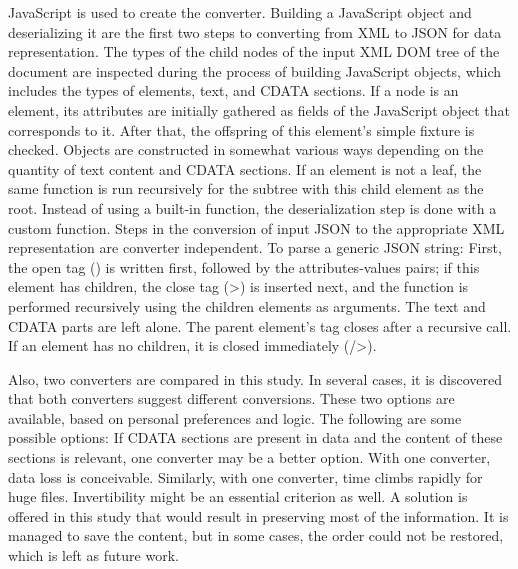 JavaScript is used to create the converter. Building a JavaScript object and
deserializing it are the first two steps to converting from XML to JSON for data
representation. The types of the child nodes of the input XML DOM tree of the
document are inspected during the process of building JavaScript objects, which
includes the types of elements, text, and CDATA sections. If a node is an
element, its attributes are initially gathered as fields of the JavaScript
object that corresponds to it. After that, the offspring of this element's
simple fixture is checked. Objects are constructed in somewhat various ways
depending on the quantity of text content and CDATA sections. If an element is
not a leaf, the same function is run recursively for the subtree with this child
element as the root. Instead of using a built-in function, the deserialization
step is done with a custom function. Steps in the conversion of input JSON to
the appropriate XML representation are converter independent. To parse a generic
JSON string: First, the open tag () is written first, followed by the
attributes-values pairs; if this element has children, the close tag (>) is
inserted next, and the function is performed recursively using the children
elements as arguments. The text and CDATA parts are left alone. The parent
element's tag closes after a recursive call. If an element has no children, it
is closed immediately (/>).

Also, two converters are compared in this study.  In several cases, it is
discovered that both converters suggest different conversions. These two options
are available, based on personal preferences and logic. The following are some
possible options: If CDATA sections are present in data and the content of these
sections is relevant, one converter may be a better option. With one converter,
data loss is conceivable. Similarly, with one converter, time climbs rapidly for
huge files. Invertibility might be an essential criterion as well. A solution is
offered in this study that would result in preserving most of the information.
It is managed to save the content, but in some cases, the order could not be
restored, which is left as future work.